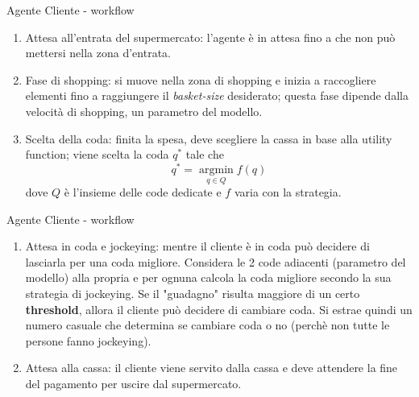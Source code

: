 \begin{frame}{Agente Cliente - workflow}
	\begin{enumerate}
		\item Attesa all'entrata del supermercato: l'agente è in attesa fino a che non può mettersi nella zona d'entrata.
		\item Fase di shopping: si muove nella zona di shopping e inizia a raccogliere elementi fino a raggiungere il \textit{basket-size} desiderato; questa fase dipende dalla velocità di shopping, un parametro del modello.
		\item Scelta della coda: finita la spesa, deve scegliere la cassa in base alla utility function; viene scelta la coda $q^*$ tale che
		\[q^* = \operatorname*{argmin}_{q \in Q} f(q)\]
		dove $Q$ è l'insieme delle code dedicate e $f$ varia con la strategia.
	\end{enumerate}
\end{frame}
\begin{frame}{Agente Cliente - workflow}
	\begin{enumerate}
		\item Attesa in coda e jockeying: mentre il cliente è in coda può decidere di lasciarla per una coda migliore. Considera le 2 code adiacenti (parametro del modello) alla propria e per ognuna calcola la coda migliore secondo la sua strategia di jockeying. Se il "guadagno" risulta maggiore di un certo \textbf{threshold}, allora il cliente può decidere di cambiare coda. Si estrae quindi un numero casuale che determina se cambiare coda o no (perchè non tutte le persone fanno jockeying).
		\item Attesa alla cassa: il cliente viene servito dalla cassa e deve attendere la fine del pagamento per uscire dal supermercato.
	\end{enumerate}
\end{frame}





